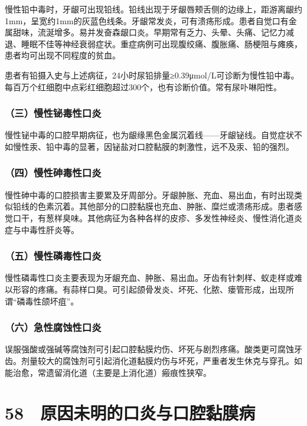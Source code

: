 慢性铅中毒时，牙龈可出现铅线。铅线出现于牙龈唇颊舌侧的边缘上，距游离龈约1mm，呈宽约1mm的灰蓝色线条。牙龈常发炎，可有溃疡形成。患者自觉口有金属甜味，流涎增多。易并发奋森龈口炎。早期常有乏力、头晕、头痛、记忆力减退、睡眠不佳等神经衰弱症状。重症病例可出现腹绞痛、腹胀痛、肠梗阻与瘫痪，患者均可出现不同程度的贫血。

患者有铅摄入史与上述病征，24小时尿铅排量≥0.39μmol/L可诊断为慢性铅中毒。每百万个红细胞中点彩红细胞超过300个，也有诊断价值。常有尿卟啉阳性。

\subsubsection{（三）慢性铋毒性口炎}

慢性铋中毒的口腔早期病征，也为龈缘黑色金属沉着线------牙龈铋线。自觉症状不如慢性汞、铅中毒的显著，因铋盐对口腔黏膜的刺激性，远不及汞、铅的强烈。

\subsubsection{（四）慢性砷毒性口炎}

慢性砷中毒的口腔损害主要累及牙周部分。牙龈肿胀、充血、易出血，有时出现类似铅线的色素沉着。其他部分的口腔黏膜也充血、肿胀、糜烂或溃疡形成。患者感觉口干，有葱样臭味。其他病征为各种各样的皮疹、多发性神经炎、慢性消化道炎症与中毒性肝炎等。

\subsubsection{（五）慢性磷毒性口炎}

慢性磷毒性口炎主要表现为牙龈充血、肿胀、易出血。牙齿有针刺样、蚁走样或难以形容的疼痛。有蒜样口臭。可引起颌骨发炎、坏死、化脓、瘘管形成，出现所谓“磷毒性颌坏疽”。

\subsubsection{（六）急性腐蚀性口炎}

误服强酸或强碱等腐蚀剂可引起口腔黏膜灼伤、坏死与剧烈疼痛。酸类更可腐蚀牙齿。剂量较大的腐蚀剂可引起消化道黏膜灼伤与坏死，严重者发生休克与穿孔。如能治愈，常遗留消化道（主要是上消化道）瘢痕性狭窄。

\protect\hypertarget{text00151.html}{}{}

\section{58　原因未明的口炎与口腔黏膜病}

